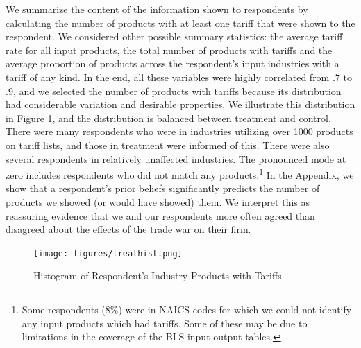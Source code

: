 \documentclass{article}
\begin{document}
We summarize the content of the information shown to respondents by calculating the number of products with at least one tariff that were shown to the respondent. We considered other possible summary statistics: the average tariff rate for all input products, the total number of products with tariffs and the average proportion of products across the respondent's input industries with a tariff of any kind. In the end, all these variables were highly correlated from .7 to .9, and we selected the number of products with tariffs because its distribution had considerable variation and desirable properties. We illustrate this distribution in Figure \ref{histtreat}, and the distribution is balanced between treatment and control. There were many respondents who were in industries utilizing over 1000 products on tariff lists, and those in treatment were informed of this. There were also several respondents in relatively unaffected industries. The pronounced mode at zero includes respondents who did not match any products.\footnote{Some respondents (8\%) were in NAICS codes for which we could not identify any input products which had tariffs. Some of these may be due to limitations in the coverage of the BLS input-output tables.} In the Appendix, we show that a respondent's prior beliefs significantly predicts the number of products we showed (or would have showed) them. We interpret this as reassuring evidence that we and our respondents more often agreed than disagreed about the effects of the trade war on their firm.

\begin{figure}
    \centering
    \texttt{[image: figures/treathist.png]}
    \caption{Histogram of Respondent's Industry Products with Tariffs}
    \label{histtreat}
\end{figure}
\end{document}
